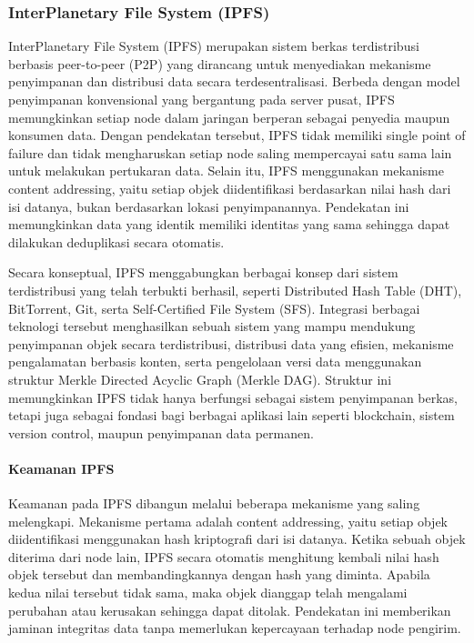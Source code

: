 \subsubsection{InterPlanetary File System (IPFS)}
InterPlanetary File System (IPFS) merupakan sistem berkas terdistribusi berbasis peer-to-peer (P2P) yang dirancang untuk menyediakan mekanisme penyimpanan dan distribusi data secara terdesentralisasi. Berbeda dengan model penyimpanan konvensional yang bergantung pada server pusat, IPFS memungkinkan setiap node dalam jaringan berperan sebagai penyedia maupun konsumen data. Dengan pendekatan tersebut, IPFS tidak memiliki single point of failure dan tidak mengharuskan setiap node saling mempercayai satu sama lain untuk melakukan pertukaran data. Selain itu, IPFS menggunakan mekanisme content addressing, yaitu setiap objek diidentifikasi berdasarkan nilai hash dari isi datanya, bukan berdasarkan lokasi penyimpanannya. Pendekatan ini memungkinkan data yang identik memiliki identitas yang sama sehingga dapat dilakukan deduplikasi secara otomatis.

Secara konseptual, IPFS menggabungkan berbagai konsep dari sistem terdistribusi yang telah terbukti berhasil, seperti Distributed Hash Table (DHT), BitTorrent, Git, serta Self-Certified File System (SFS). Integrasi berbagai teknologi tersebut menghasilkan sebuah sistem yang mampu mendukung penyimpanan objek secara terdistribusi, distribusi data yang efisien, mekanisme pengalamatan berbasis konten, serta pengelolaan versi data menggunakan struktur Merkle Directed Acyclic Graph (Merkle DAG). Struktur ini memungkinkan IPFS tidak hanya berfungsi sebagai sistem penyimpanan berkas, tetapi juga sebagai fondasi bagi berbagai aplikasi lain seperti blockchain, sistem version control, maupun penyimpanan data permanen.

\paragraph{Keamanan IPFS}
Keamanan pada IPFS dibangun melalui beberapa mekanisme yang saling melengkapi. Mekanisme pertama adalah content addressing, yaitu setiap objek diidentifikasi menggunakan hash kriptografi dari isi datanya. Ketika sebuah objek diterima dari node lain, IPFS secara otomatis menghitung kembali nilai hash objek tersebut dan membandingkannya dengan hash yang diminta. Apabila kedua nilai tersebut tidak sama, maka objek dianggap telah mengalami perubahan atau kerusakan sehingga dapat ditolak. Pendekatan ini memberikan jaminan integritas data tanpa memerlukan kepercayaan terhadap node pengirim.

